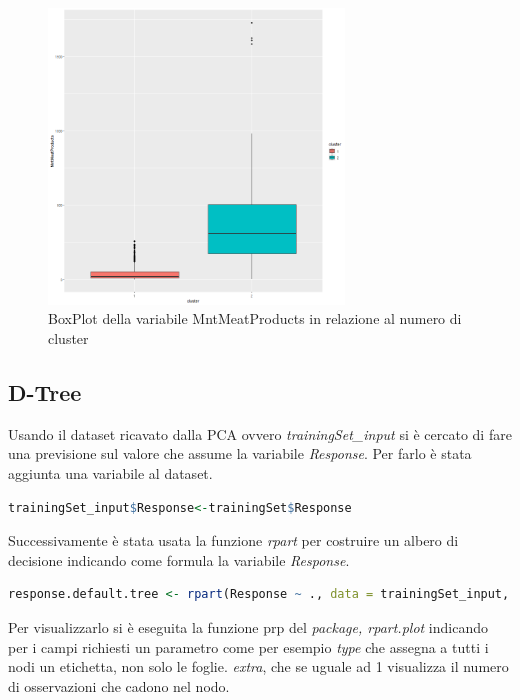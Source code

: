 \documentclass[letterpaper,11pt]{article}
\begin{document}
\begin{figure}[H]
    \centering
    \includegraphics[width=0.7\textwidth]{Img/K-MEANS/KMEANS021.png}
    \caption{BoxPlot della variabile MntMeatProducts in relazione al numero di cluster}
    \label{fig:MntMeatProductsKmeansBoxPlot}
\end{figure}


\newpage
\subsection{D-Tree}
Usando il dataset ricavato dalla PCA ovvero \textit{trainingSet\_input} si è cercato di fare una previsione sul valore che assume la variabile \textit{Response}. Per farlo è stata aggiunta una variabile al dataset. 

\begin{lstlisting}[language=R]
trainingSet_input$Response<-trainingSet$Response
\end{lstlisting}

Successivamente è stata usata la funzione \textit{rpart} per costruire un albero di decisione indicando come formula la variabile \textit{Response}.

\begin{lstlisting}[language=R]
response.default.tree <- rpart(Response ~ ., data = trainingSet_input, method = "class")
\end{lstlisting}

Per visualizzarlo si è eseguita la funzione prp del \textit{package, rpart.plot} indicando per i campi richiesti un parametro come per esempio \textit{type} che assegna a tutti i nodi un etichetta, non solo le foglie. \textit{extra}, che se uguale ad 1 visualizza il numero di osservazioni che cadono nel nodo. 
\end{document}

